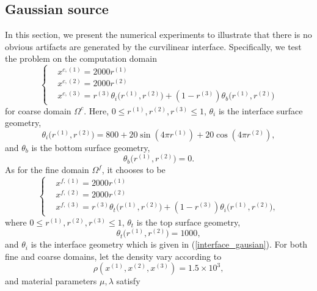 \subsection{Gaussian source}\label{gaussian_source}
In this section, we present the numerical experiments to illustrate that there is no obvious artifacts are generated by the curvilinear interface. Specifically, we test the problem on the computation domain
\begin{equation}
\left\{
\begin{aligned}
& x^{c,(1)} = 2000 r^{(1)}\\
& x^{c,(2)} = 2000 r^{(2)}\\
& x^{c,(3)} = r^{(3)} \theta_i\big(r^{(1)}, r^{(2)}\big) + (1-r^{(3)}) \theta_b\big(r^{(1)},r^{(2)}\big)
\end{aligned}
\right.
\end{equation}
for coarse domain $\Omega^c$. Here, $0\leq r^{(1)}, r^{(2)}, r^{(3)}\leq 1$, $\theta_i$ is the interface surface geometry,
\begin{equation}\label{interface_gausian}
\theta_i\big(r^{(1)},r^{(2)}\big) = 800+20\sin(4\pi r^{(1)})+20\cos(4\pi r^{(2)}),
\end{equation}
and 
$\theta_b$ is the bottom surface geometry,
\begin{equation}
\theta_b\big(r^{(1)},r^{(2)}\big) = 0.
\end{equation}
As for the fine domain $\Omega^f$, it chooses to be
\begin{equation}
\left\{
\begin{aligned}
& x^{f,(1)} = 2000 r^{(1)}\\
& x^{f,(2)} = 2000 r^{(2)}\\
& x^{f,(3)} = r^{(3)}\theta_t\big(r^{(1)},r^{(2)}\big) + (1-r^{(3)})\theta_i\big(r^{(1)},r^{(2)}\big),
\end{aligned}
\right.
\end{equation}
where $0\leq r^{(1)}, r^{(2)}, r^{(3)}\leq 1$, $\theta_t$ is the top surface geometry,
\begin{equation}
\theta_t\big(r^{(1)},r^{(2)}\big) = 1000,
\end{equation}
and $\theta_i$ is the interface geometry which is given in (\ref{interface_gausian}). For both fine and coarse domains, let the density vary according to
\begin{equation}
\rho(x^{(1)},x^{(2)},x^{(3)}) = 1.5\times 10^3,
\end{equation}
and material parameters $\mu, \lambda$ satisfy
